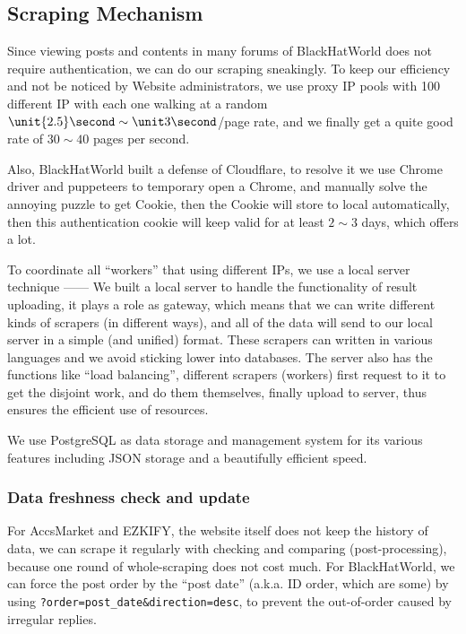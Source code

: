 \documentclass{article}
\begin{document}
	\subsection{Scraping Mechanism}

	Since viewing posts and contents in many forums of BlackHatWorld does not require authentication, we can do our scraping sneakingly. To keep our efficiency and not be noticed by Website administrators, we use proxy IP pools with 100 different IP with each one walking at a random $\unit {2.5} \second \sim \unit 3 \second$/page rate, and we finally get a quite good rate of $30 \sim 40$ pages per second.

	Also, BlackHatWorld built a defense of Cloudflare, to resolve it we use Chrome driver and puppeteers to temporary open a Chrome, and manually solve the annoying puzzle to get Cookie, then the Cookie will store to local automatically, then this authentication cookie will keep valid for at least $2 \sim 3$ days, which offers a lot.

	To coordinate all ``workers'' that using different IPs, we use a local server technique ------ We built a local server to handle the functionality of result uploading, it plays a role as gateway, which means that we can write different kinds of scrapers (in different ways), and all of the data will send to our local server in a simple (and unified) format. These scrapers can written in various languages and we avoid sticking lower into databases. The server also has the functions like ``load balancing'', different scrapers (workers) first request to it to get the disjoint work, and do them themselves, finally upload to server, thus ensures the efficient use of resources.

	We use PostgreSQL as data storage and management system for its various features including JSON storage and a beautifully efficient speed.

	\subsubsection{Data freshness check and update}

	For AccsMarket and EZKIFY, the website itself does not keep the history of data, we can scrape it regularly with checking and comparing (post-processing), because one round of whole-scraping does not cost much. For BlackHatWorld, we can force the post order by the ``post date'' (a.k.a. ID order, which are some) by using \verb!?order=post_date&direction=desc!, to prevent the out-of-order caused by irregular replies.
\end{document}
